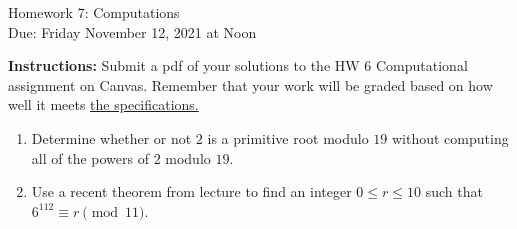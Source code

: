 \documentclass[10pt,a4paper]{article}
\begin{document}
\begin{center}
{\Large Homework 7: Computations}\\
Due: Friday November 12, 2021 at Noon\\


\end{center}
{\bf Instructions:} Submit a pdf of your solutions to the HW 6 Computational assignment on Canvas. Remember that your work will be graded based on how well it meets \href{https://docs.google.com/document/d/1emM06_WRh_h941rsjtRE9fRVndJtfRKd9gyS3Fs_rFA/edit?usp=sharing}{the specifications. }


\begin{enumerate}
 \item Determine whether or not $2$ is a primitive root modulo $19$ without computing all of the powers of $2$ modulo $19$.


\item Use a recent theorem from lecture to find an integer $0\le r\le 10$ such that $6^{112}\equiv r\pmod{11}$. 
   
\end{enumerate}
\end{document}
